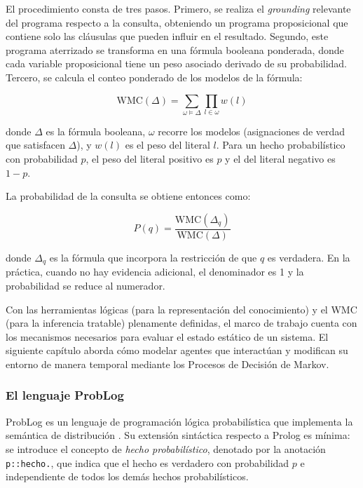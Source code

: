 El procedimiento consta de tres pasos. Primero, se realiza el \textit{grounding} relevante del programa respecto a la consulta, obteniendo un programa proposicional que contiene solo las cláusulas que pueden influir en el resultado. Segundo, este programa aterrizado se transforma en una fórmula booleana ponderada, donde cada variable proposicional tiene un peso asociado derivado de su probabilidad. Tercero, se calcula el conteo ponderado de los modelos de la fórmula:

\begin{equation}
    \text{WMC}(\Delta) = \sum_{\omega \models \Delta} \prod_{l \in \omega} w(l)
    \label{eq:wmc}
\end{equation}

donde $\Delta$ es la fórmula booleana, $\omega$ recorre los modelos (asignaciones de verdad que satisfacen $\Delta$), y $w(l)$ es el peso del literal $l$. Para un hecho probabilístico con probabilidad $p$, el peso del literal positivo es $p$ y el del literal negativo es $1 - p$.

La probabilidad de la consulta se obtiene entonces como:

\begin{equation}
    P(q) = \frac{\text{WMC}(\Delta_q)}{\text{WMC}(\Delta)}
    \label{eq:prob-wmc}
\end{equation}

donde $\Delta_q$ es la fórmula que incorpora la restricción de que $q$ es verdadera. En la práctica, cuando no hay evidencia adicional, el denominador es 1 y la probabilidad se reduce al numerador.

Con las herramientas lógicas (para la representación del conocimiento) y el WMC (para la inferencia tratable) plenamente definidas, el marco de trabajo cuenta con los mecanismos necesarios para evaluar el estado estático de un sistema. El siguiente capítulo aborda cómo modelar agentes que interactúan y modifican su entorno de manera temporal mediante los Procesos de Decisión de Markov.

\clearpage

\subsubsection{El lenguaje ProbLog}

ProbLog es un lenguaje de programación lógica probabilística que implementa la semántica de distribución \cite{deraedt2007problog, deraedt2015probabilistic}. Su extensión sintáctica respecto a Prolog es mínima: se introduce el concepto de \textit{hecho probabilístico}, denotado por la anotación \texttt{p::hecho.}, que indica que el hecho es verdadero con probabilidad $p$ e independiente de todos los demás hechos probabilísticos.

